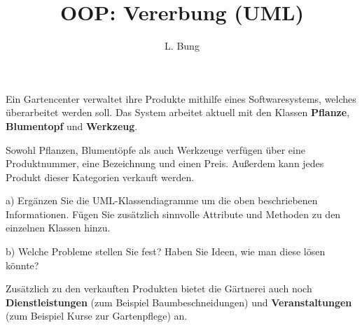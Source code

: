 \documentclass[11pt, a4paper, oneside]{article}
\begin{document}
	\author{L. Bung}
	\title{OOP: Vererbung (UML)}
	\subject{SAE}
	\maketitle
	
	
	Ein Gartencenter verwaltet ihre Produkte mithilfe eines Softwaresystems, welches überarbeitet werden soll.
	Das System arbeitet aktuell mit den Klassen \textbf{Pflanze}, \textbf{Blumentopf} und \textbf{Werkzeug}.
	
	Sowohl Pflanzen, Blumentöpfe als auch Werkzeuge verfügen über eine Produktnummer, eine Bezeichnung und einen Preis.
	Außerdem kann jedes Produkt dieser Kategorien verkauft werden.
	
	a) Ergänzen Sie die UML-Klassendiagramme um die oben beschriebenen Informationen.
	Fügen Sie zusätzlich sinnvolle Attribute und Methoden zu den einzelnen Klassen hinzu.
	
	\begin{figure}[h]
		\centering
		\vspace{5cm}
	\end{figure}
	
	b) Welche Probleme stellen Sie fest? Haben Sie Ideen, wie man diese lösen könnte?
	
	\lines[3cm]
	
	
	Zusätzlich zu den verkauften Produkten bietet die Gärtnerei auch noch \textbf{Dienstleistungen} (zum Beispiel Baumbeschneidungen) und \textbf{Veranstaltungen} (zum Beispiel Kurse zur Gartenpflege) an.
	
\end{document}
